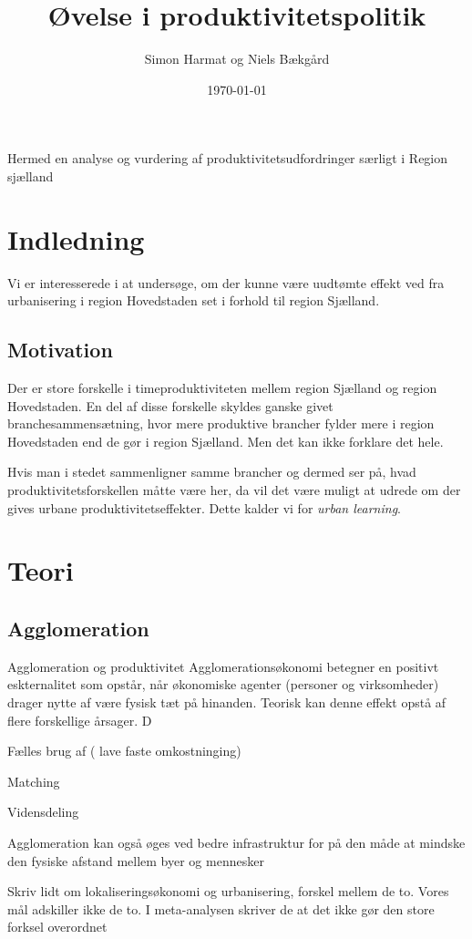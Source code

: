 \documentclass[a4paper, 12pt, titlepage]{article}
\author{Simon Harmat og Niels Bækgård}
\title{Øvelse i produktivitetspolitik}
\date{\today}
\begin{document}
Hermed en analyse og vurdering af produktivitetsudfordringer særligt i Region sjælland

\section{Indledning}
Vi er interesserede i at undersøge, om der kunne være uudtømte effekt ved fra urbanisering i region Hovedstaden set i forhold til region Sjælland. 
\subsection{Motivation}
Der er store forskelle i timeproduktiviteten mellem region Sjælland og region Hovedstaden. En del af disse forskelle skyldes ganske givet branchesammensætning, hvor mere produktive brancher fylder mere i region Hovedstaden end de gør i region Sjælland. Men det kan ikke forklare det hele.

Hvis man i stedet sammenligner samme brancher og dermed ser på, hvad produktivitetsforskellen måtte være her, da vil det være muligt at udrede om der gives urbane produktivitetseffekter. Dette kalder vi for \emph{urban learning}.
\section{Teori}
\subsection{Agglomeration}

Agglomeration og produktivitet
Agglomerationsøkonomi betegner en positivt eskternalitet som opstår, når økonomiske agenter (personer og virksomheder) drager nytte af være fysisk tæt på hinanden. Teorisk kan denne effekt opstå af flere forskellige årsager. D

Fælles brug af ( lave faste omkostninging) 



Matching


Vidensdeling 

Agglomeration kan også øges ved bedre infrastruktur for på den måde at mindske den fysiske afstand mellem byer og mennesker

Skriv lidt om lokaliseringsøkonomi og urbanisering, forskel mellem de to. Vores mål adskiller ikke de to. I meta-analysen skriver de at det ikke gør den store forksel overordnet
\end{document}
